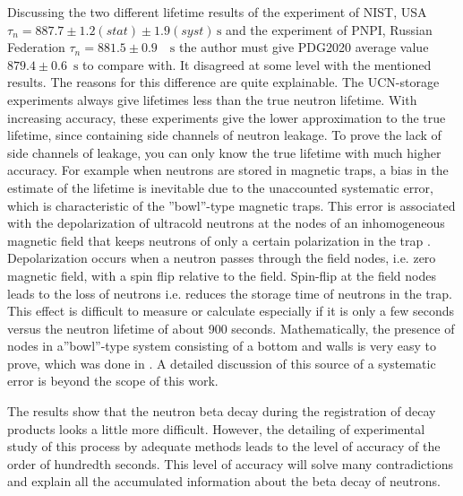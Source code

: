 \documentclass[article]{elsarticle}
\begin{document}
Discussing the two different lifetime results of the experiment of NIST, USA
$\tau_n=887.7\pm 1.2(stat)\pm 1.9 (syst) \, \mbox{s}$ \cite{Yue2013}  and the experiment of PNPI, Russian Federation  $\tau_n=881.5 \pm 0.9 \quad \mbox{s}$ \cite{Sereb2018} the author must give PDG2020 average value $879.4 \pm 0.6 \, \mbox{ s}$ to compare with. It disagreed at some level with the mentioned results. The reasons for this difference are quite explainable. The UCN-storage experiments always give lifetimes less than the true neutron lifetime. With increasing accuracy, these experiments give the lower approximation to the true lifetime, since containing side channels of neutron leakage. To prove the lack of side channels of leakage, you can only know the true lifetime with much higher accuracy. For example when neutrons are stored in magnetic traps, a bias in the estimate of the lifetime is inevitable due to the unaccounted systematic error, which is characteristic of the ”bowl”-type magnetic traps. This error is associated with the depolarization of ultracold neutrons at the nodes of an inhomogeneous magnetic field that keeps neutrons of only a certain polarization in the trap \cite {VladVV}. Depolarization occurs when a neutron passes through the field nodes, i.e. zero magnetic field, with a spin flip relative to the field. Spin-flip at the field nodes leads to the loss of neutrons i.e. reduces the storage time of neutrons in the trap. This effect is difficult to measure or calculate especially if it is only a few seconds versus the neutron lifetime of about 900 seconds. Mathematically, the presence of nodes in a”bowl”-type system consisting of a bottom and walls is very easy to prove, which was done in \cite{VVV}.  A detailed discussion of this source of a systematic error is beyond the scope of this work.

The results show that the neutron beta decay during the registration of decay products looks a little more difficult. However, the detailing of experimental study of this process by adequate methods leads to the level of accuracy of the order of hundredth seconds.  This level of accuracy will solve many contradictions and explain all the accumulated information about the beta decay of neutrons.
\end{document}
